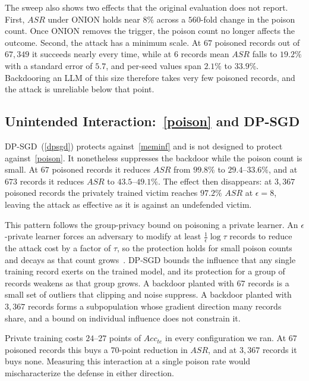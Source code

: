 The sweep also shows two effects that the original evaluation does not report.
First, $ASR$ under ONION holds near $8\%$ across a $560$-fold change in the poison count.
Once ONION removes the trigger, the poison count no longer affects the outcome.
Second, the attack has a minimum scale.
At $67$ poisoned records out of $67{,}349$ it succeeds nearly every time, while at $6$ records mean $ASR$ falls to $19.2\%$ with a standard error of $5.7$, and per-seed values span $2.1\%$ to $33.9\%$.
Backdooring an LLM of this size therefore takes very few poisoned records, and the attack is unreliable below that point.

\subsection{Unintended Interaction:~\ref{poison} and DP-SGD}

DP-SGD~(\ref{dpsgd}) protects against~\ref{meminf} and is not designed to protect against~\ref{poison}.
It nonetheless suppresses the backdoor while the poison count is small.
At $67$ poisoned records it reduces $ASR$ from $99.8\%$ to $29.4$--$33.6\%$, and at $673$ records it reduces $ASR$ to $43.5$--$49.1\%$.
The effect then disappears: at $3{,}367$ poisoned records the privately trained victim reaches $97.2\%$ $ASR$ at $\epsilon=8$, leaving the attack as effective as it is against an undefended victim.

This pattern follows the group-privacy bound on poisoning a private learner.
An $\epsilon$-private learner forces an adversary to modify at least $\frac{1}{\epsilon}\log\tau$ records to reduce the attack cost by a factor of $\tau$, so the protection holds for small poison counts and decays as that count grows~\cite{ma2019DataPoisoningDifferentiallyPrivate}.
DP-SGD bounds the influence that any single training record exerts on the trained model, and its protection for a group of records weakens as that group grows.
A backdoor planted with $67$ records is a small set of outliers that clipping and noise suppress.
A backdoor planted with $3{,}367$ records forms a subpopulation whose gradient direction many records share, and a bound on individual influence does not constrain it.

Private training costs $24$--$27$ points of $Acc_{te}$ in every configuration we ran.
At $67$ poisoned records this buys a $70$-point reduction in $ASR$, and at $3{,}367$ records it buys none.
Measuring this interaction at a single poison rate would mischaracterize the defense in either direction.

